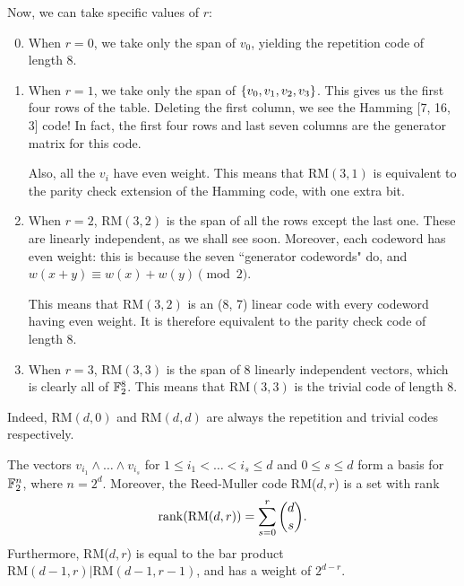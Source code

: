 \documentclass{article}
\begin{document}
Now, we can take specific values of $r$:
\begin{enumerate}
	\setcounter{enumi}{-1}
    \item When $r = 0$, we take only the span of $v_0$, yielding the repetition code of length 8.
    \item When $r = 1$, we take only the span of $\left\lbrace v_0, v_1, v_2, v_3 \right\rbrace$. This gives us the first four rows of the table. Deleting the first column, we see the Hamming [7, 16, 3] code! In fact, the first four rows and last seven columns are the generator matrix for this code.
    
    Also, all the $v_i$ have even weight. This means that $\mathrm{RM}(3, 1)$ is equivalent to the parity check extension of the Hamming code, with one extra bit.
    \item When $r = 2$, $\mathrm{RM}(3, 2)$ is the span of all the rows except the last one. These are linearly independent, as we shall see soon. Moreover, each codeword has even weight: this is because the seven ``generator codewords" do, and $w(x + y) \equiv w(x) + w(y) \pmod{2}$.
    
    This means that $\mathrm{RM}(3, 2)$ is an (8, 7) linear code with every codeword having even weight. It is therefore equivalent to the parity check code of length 8.
    \item When $r = 3$, $\mathrm{RM}(3, 3)$ is the span of 8 linearly independent vectors, which is clearly all of $\mathbb{F}_2^8$. This means that $\mathrm{RM}(3, 3)$ is the trivial code of length 8.
\end{enumerate}
Indeed, $\mathrm{RM}(d, 0)$ and $\mathrm{RM}(d, d)$ are always the repetition and trivial codes respectively.

\begin{theorem}
	\label{reed-muller-recurrence}
    The vectors $v_{i_1} \land \dots \land v_{i_s}$ for $1 \leq i_1 < \dots < i_s \leq d$ and $0 \leq s \leq d$ form a basis for $\mathbb{F}_2^n$, where $n = 2^d$. Moreover, the Reed-Muller code RM($d, r$) is a set with rank
    \[
	\operatorname{rank}(\mathrm{RM}(d, r)) = \sum_{s = 0}^r \binom{d}{s}.
	\]
	Furthermore, RM($d, r$) is equal to the bar product $\mathrm{RM}(d-1, r)|\mathrm{RM}(d-1, r-1)$, and has a weight of $2^{d-r}$.
\end{theorem}
\end{document}
